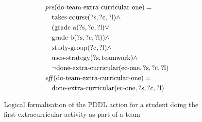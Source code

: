 \begin{figure}[t]
  \small  %
  \begin{align*}
  &\mathit{pre}(\text{do-team-extra-curricular-one}) = \\
  &\quad \text{takes-course}(\text{?s}, \text{?c}, \text{?l}) \land \\
  &\quad (\text{grade a}(\text{?s}, \text{?c}, \text{?l}) \lor \\
  &\quad \text{grade b}(\text{?s}, \text{?c}, \text{?l})) \land \\
  &\quad \text{study-group}(\text{?c}, \text{?l}) \land \\
  &\quad \text{uses-strategy}(\text{?s}, \text{teamwork}) \land \\
  &\quad \lnot \text{done-extra-curricular}(\text{ec-one}, \text{?s}, \text{?c}, \text{?l}) \\
  &\mathit{eff}(\text{do-team-extra-curricular-one}) = \\
  &\quad \text{done-extra-curricular}(\text{ec-one}, \text{?s}, \text{?c}, \text{?l})
  \end{align*}
  \caption{Logical formalisation of the PDDL action for a student doing the first extracurricular activity as part of a team}\label{fig:team-extra-curricular-one}
\end{figure}